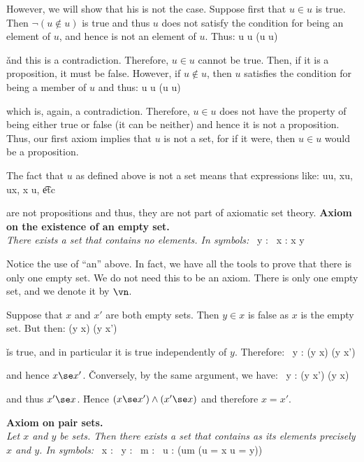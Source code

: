 However, we will show that his is not the case. Suppose first that $u\in u$ is true. Then $\neg(u\notin u)$ is true
and thus $u$ does not satisfy the condition for being an element of $u$, and hence is not an element of $u$. Thus:
\bse
u \in u \imp \neg(u \in u)
\ese

\v

and this is a contradiction. Therefore, $u\in u$ cannot be true. Then, if it is a proposition, it must be false.
However, if $u \notin u$, then $u$ satisfies the condition for being a member of $u$ and thus:
\bse
u \notin u \imp \neg(u \notin u)
\ese

which is, again, a contradiction. Therefore, $u\in u$ does not have the property of being either true or false (it
can be neither) and hence it is not a proposition. Thus, our first axiom implies that $u$ is not a set, for if it
were, then $u\in u$ would be a proposition.
\ee

The fact that $u$ as defined above is not a set means that expressions like:
\bse
u\in u, \quad x\in u, \quad u\in x, \quad x \notin u, \quad \t{etc}
\ese

are not propositions and thus, they are not part of axiomatic set theory. \v

\textbf{Axiom on the existence of an empty set.}\\
\emph{There exists a set that contains no elements. In symbols:}
\bse
\exists \, y : \forall \, x : x \notin y
\ese

Notice the use of ``an'' above. In fact, we have all the tools to prove that there is only one empty set. We do not
need this to be an axiom.
\bt[]
There is only one empty set, and we denote it by $\vn$.
\et

\bq
Suppose that $x$ and $x'$ are both empty sets. Then $y\in x$ is false as $x$ is the empty set. But then:
\bse
(y \in x) \imp (y \in x')
\ese

\v

is true, and in particular it is true independently of $y$. Therefore:
\bse
\forall \, y : (y \in x) \imp (y \in x')
\ese

and hence $x \se x'$. \v

Conversely, by the same argument, we have:
\bse
\forall \, y : (y \in x') \imp (y \in x)
\ese

and thus $x' \se x$. \v

Hence $(x \se x') \land (x' \se x)$ and therefore $x = x'$.
\eq

\textbf{Axiom on pair sets.} \\
\emph{Let $x$ and $y$ be sets. Then there exists a set that contains as its elements precisely $x$ and $y$. In symbols:}
\bse
\forall \, x : \forall \, y : \exists \, m : \forall \, u : (u\in m \eqv (u = x \lor u = y))
\ese

